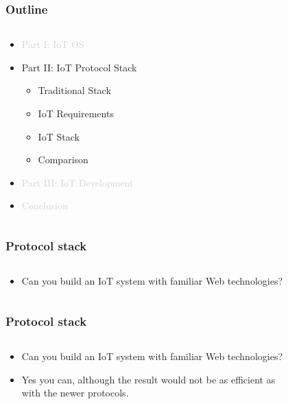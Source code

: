 \documentclass{beamer}
\begin{document}
\begin{frame}
	\frametitle{Outline}
	\begin{columns}[c]
		\begin{column}{30cm}
			\vspace{.1cm}
			\begin{itemize}
				\justifying
				\item \textcolor{LightGray}{Part I: IoT OS}
				\item Part II: IoT Protocol Stack
				\begin{itemize}
					\item Traditional Stack
					\item IoT Requirements
					\item IoT Stack
					\item Comparison
				\end{itemize}
				\item \textcolor{LightGray}{Part III: IoT Development}
				\item \textcolor{LightGray}{Conclusion}
			\end{itemize}
		\end{column}
	\end{columns}
\end{frame}

\begin{frame}
	\frametitle{Protocol stack}
	\begin{columns}[c]
		\begin{column}{30cm}
			\vspace{.1cm}
			\begin{itemize}
				\justifying
				\item Can you build an IoT system with familiar Web technologies?
			\end{itemize}
		\end{column}
	\end{columns}
\end{frame}

\begin{frame}
	\frametitle{Protocol stack}
	\begin{columns}[c]
		\begin{column}{30cm}
			\vspace{.1cm}
			\begin{itemize}
				\justifying
				\item Can you build an IoT system with familiar Web technologies?
				\item Yes you can, although the result would not be as \textcolor{Ocean}{efficient} as\\
				with the \textcolor{TextGreen}{newer protocols}.
			\end{itemize}
		\end{column}
	\end{columns}
\end{frame}
\end{document}

